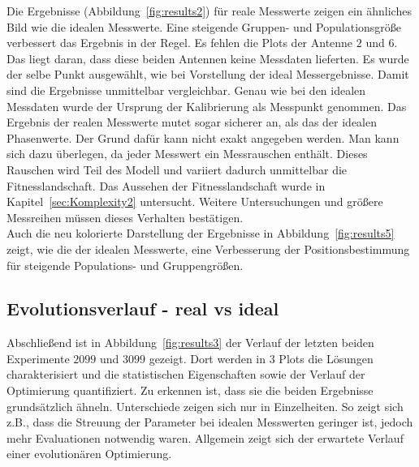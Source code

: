 Die Ergebnisse (Abbildung~\ref{fig:results2}) für reale Messwerte zeigen ein ähnliches Bild wie die idealen Messwerte. Eine steigende Gruppen- und Populationsgröße verbessert das Ergebnis in der Regel. Es fehlen die Plots der Antenne $2$ und $6$. Das liegt daran, dass diese beiden Antennen keine Messdaten lieferten. Es wurde der selbe Punkt ausgewählt, wie bei Vorstellung der ideal Messergebnisse. Damit sind die Ergebnisse unmittelbar vergleichbar. Genau wie bei den idealen Messdaten wurde der Ursprung der Kalibrierung als Messpunkt genommen. Das Ergebnis der realen Messwerte mutet sogar sicherer an, als das der idealen Phasenwerte. Der Grund dafür kann nicht exakt angegeben werden. Man kann sich dazu überlegen, da jeder Messwert ein Messrauschen enthält. Dieses Rauschen wird Teil des Modell und variiert dadurch unmittelbar die Fitnesslandschaft. Das Aussehen der Fitnesslandschaft wurde in Kapitel~\ref{sec:Komplexity2} untersucht. Weitere Untersuchungen und größere Messreihen müssen dieses Verhalten bestätigen.\\

Auch die neu kolorierte Darstellung der Ergebnisse in Abbildung~\ref{fig:results5} zeigt, wie die der idealen Messwerte, eine Verbesserung der Positionsbestimmung für steigende Populations- und Gruppengrößen.
%
%
\subsection{Evolutionsverlauf - real vs ideal}
%
Abschließend ist in Abbildung~\ref{fig:results3} der Verlauf der letzten beiden Experimente $2099$ und $3099$ gezeigt. Dort werden in $3$ Plots die Lösungen charakterisiert und die statistischen Eigenschaften sowie der Verlauf der Optimierung quantifiziert. Zu erkennen ist, dass sie die beiden Ergebnisse grundsätzlich ähneln. Unterschiede zeigen sich nur in Einzelheiten. So zeigt sich z.B., dass die Streuung der Parameter bei idealen Messwerten geringer ist, jedoch mehr Evaluationen notwendig waren. Allgemein zeigt sich der erwartete Verlauf einer evolutionären Optimierung.
%
%
